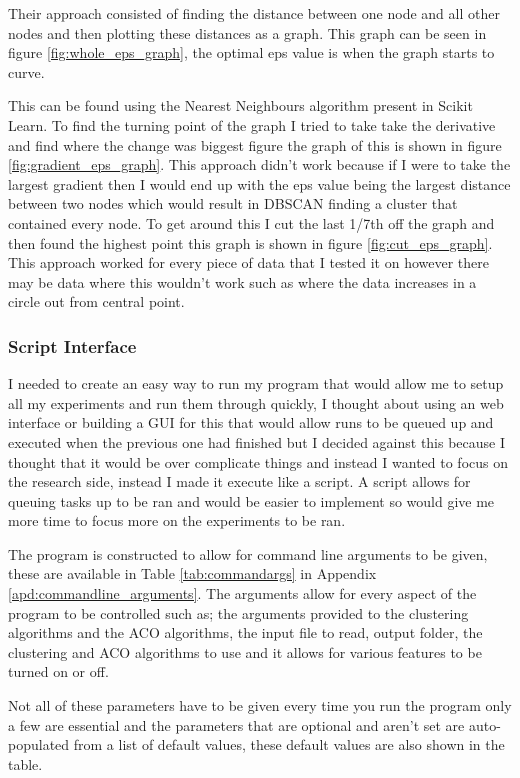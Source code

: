 Their approach consisted of finding the distance between one node and all other nodes and then plotting these distances as a graph. This graph can be seen in figure \ref{fig:whole_eps_graph}, the optimal eps value is when the graph starts to curve. 

This can be found using the Nearest Neighbours algorithm present in Scikit Learn\cite{scikit_learn_nearest_neighbours}. To find the turning point of the graph I tried to take take the derivative and find where the change was biggest figure the graph of this is shown in figure \ref{fig:gradient_eps_graph}. This approach didn't work because if I were to take the largest gradient then I would end up with the eps value being the largest distance between two nodes which would result in DBSCAN finding a cluster that contained every node. To get around this I cut the last 1/7th off the graph and then found the highest point this graph is shown in figure \ref{fig:cut_eps_graph}. This approach worked for every piece of data that I tested it on however there may be data where this wouldn't work such as where the data increases in a circle out from central point.

\subsubsection{Script Interface}

I needed to create an easy way to run my program that would allow me to setup all my experiments and run them through quickly, I thought about using an web interface or building a GUI for this that would allow runs to be queued up and executed when the previous one had finished but I decided against this because I thought that it would be over complicate things and instead I wanted to focus on the research side, instead I made it execute like a script. A script allows for queuing tasks up to be ran and would be easier to implement so would give me more time to focus more on the experiments to be ran.

The program is constructed to allow for command line arguments to be given, these are available in Table \ref{tab:commandargs} in Appendix \ref{apd:commandline_arguments}. The arguments allow for every aspect of the program to be controlled such as; the arguments provided to the clustering algorithms and the ACO algorithms, the input file to read, output folder, the clustering and ACO algorithms to use and it allows for various features to be turned on or off. 

Not all of these parameters have to be given every time you run the program only a few are essential and the parameters that are optional and aren't set are auto-populated from a list of default values, these default values are also shown in the table.

